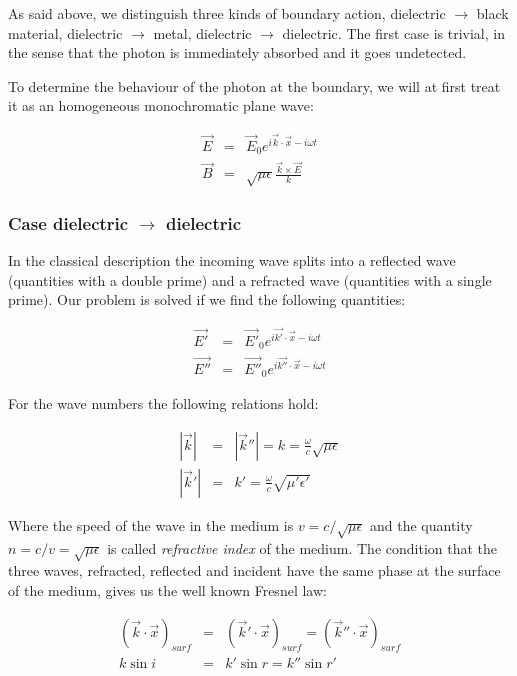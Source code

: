 As said above, we distinguish three kinds of boundary action, dielectric
$\rightarrow$ black material, dielectric $\rightarrow$ metal, dielectric
$\rightarrow$ dielectric. The first case is trivial,
in the sense that the photon is immediately absorbed and it goes
undetected. 

To determine the behaviour of the photon at the boundary,
we will at first treat it as an homogeneous monochromatic plane wave:

\begin{eqnarray*}
\vec{E} & = & \vec{E}_{0} e^{i \vec{k} \cdot \vec{x} - i \omega t} \\
\vec{B} & = & \sqrt{\mu \epsilon} \frac{\vec{k} \times \vec{E}}{k}
\end{eqnarray*}

\subsubsection{Case dielectric $\rightarrow$ dielectric}

In the classical description the incoming wave splits into a reflected
wave (quantities with a double prime) and a refracted wave (quantities
with a single prime). Our problem is solved if we find the following 
quantities:

\begin{eqnarray*}
\vec{E'} & = & \vec{E'}_{0} e^{i \vec{k'} \cdot \vec{x} - i \omega t} \\
\vec{E''} & = & \vec{E''}_{0} e^{i \vec{k''} \cdot \vec{x} - i \omega t}
\end{eqnarray*}

For the wave numbers the following relations hold:

\begin{eqnarray*}
|\vec{k}| & = & |\vec{k}''| = k = \frac{\omega}{c} \sqrt{\mu \epsilon} \\
|\vec{k}'| & = & k' = \frac{\omega}{c} \sqrt{\mu' \epsilon'}
\end{eqnarray*}

Where the speed of the wave in the medium is $v=c/\sqrt{\mu \epsilon}$
and the quantity $n=c/v=\sqrt{\mu \epsilon}$ is called {\it refractive
index} of the medium. The condition that the three waves, refracted, reflected
and incident have the same phase at the surface of the medium, gives us the
well known Fresnel law:

\begin{eqnarray*}
(\vec{k} \cdot \vec{x})_{surf} & = & (\vec{k}' \cdot \vec{x})_{surf} =
(\vec{k}'' \cdot \vec{x})_{surf} \\
k \sin{i} & = & k' \sin{r} = k'' \sin{r'}
\end{eqnarray*}

